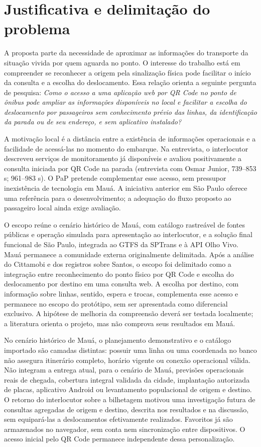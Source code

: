 \documentclass[12pt,oneside,a4paper,brazil,chapter=TITLE]{abntex2}
\let\papsection\section
\renewcommand{\section}{\clearpage\papsection}
\begin{document}
\section{Justificativa e delimitação do problema}
A proposta parte da necessidade de aproximar as informações do transporte da situação vivida por quem aguarda no ponto. O interesse do trabalho está em compreender se reconhecer a origem pela sinalização física pode facilitar o início da consulta e a escolha do deslocamento. Essa relação orienta a seguinte pergunta de pesquisa: \textit{Como o acesso a uma aplicação web por QR Code no ponto de ônibus pode ampliar as informações disponíveis no local e facilitar a escolha do deslocamento por passageiros sem conhecimento prévio das linhas, da identificação da parada ou de seu endereço, e sem aplicativo instalado?}

A motivação local é a distância entre a existência de informações operacionais e a facilidade de acessá-las no momento do embarque. Na entrevista, o interlocutor descreveu serviços de monitoramento já disponíveis e avaliou positivamente a consulta iniciada por QR Code na parada  (entrevista com Osmar Junior, 739--853 s; 961--983 s). O PaP pretende complementar esse acesso, sem pressupor inexistência de tecnologia em Mauá. A iniciativa anterior em São Paulo oferece uma referência para o desenvolvimento; a adequação do fluxo proposto ao passageiro local ainda exige avaliação.

O escopo reúne o cenário histórico de Mauá, com catálogo rastreável de fontes públicas e operação simulada para apresentação ao interlocutor, e a solução final funcional de São Paulo, integrada ao GTFS da SPTrans e à API Olho Vivo. Mauá permanece a comunidade externa originalmente delimitada. Após a análise do Cittamobi e dos registros sobre Santos, o escopo foi delimitado como a integração entre reconhecimento do ponto físico por QR Code e escolha do deslocamento por destino em uma consulta web. A escolha por destino, com informação sobre linhas, sentido, espera e trocas, complementa esse acesso e permanece no escopo do protótipo, sem ser apresentada como diferencial exclusivo. A hipótese de melhoria da compreensão deverá ser testada localmente; a literatura orienta o projeto, mas não comprova seus resultados em Mauá.

No cenário histórico de Mauá, o planejamento demonstrativo e o catálogo importado são camadas distintas: possuir uma linha ou uma coordenada no banco não assegura itinerário completo, horário vigente ou conexão operacional válida. Não integram a entrega atual, para o cenário de Mauá, previsões operacionais reais de chegada, cobertura integral validada da cidade, implantação autorizada de placas, aplicativo Android ou levantamento populacional de origem e destino. O retorno do interlocutor sobre a bilhetagem motivou uma investigação futura de consultas agregadas de origem e destino, descrita nos resultados e na discussão, sem equipará-las a deslocamentos efetivamente realizados. Favoritos já são armazenados no navegador, sem conta nem sincronização entre dispositivos. O acesso inicial pelo QR Code permanece independente dessa personalização.
\end{document}
